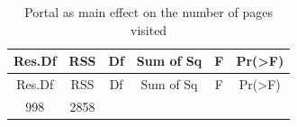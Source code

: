 \documentclass[]{article}
\begin{document}
\begin{longtable}[]{@{}cccccc@{}}
\caption{Portal as main effect on the number of pages
visited}\tabularnewline
\toprule
\begin{minipage}[b]{0.10\columnwidth}\centering\strut
Res.Df\strut
\end{minipage} & \begin{minipage}[b]{0.08\columnwidth}\centering\strut
RSS\strut
\end{minipage} & \begin{minipage}[b]{0.06\columnwidth}\centering\strut
Df\strut
\end{minipage} & \begin{minipage}[b]{0.14\columnwidth}\centering\strut
Sum of Sq\strut
\end{minipage} & \begin{minipage}[b]{0.09\columnwidth}\centering\strut
F\strut
\end{minipage} & \begin{minipage}[b]{0.13\columnwidth}\centering\strut
Pr(\textgreater{}F)\strut
\end{minipage}\tabularnewline
\midrule
\endfirsthead
\toprule
\begin{minipage}[b]{0.10\columnwidth}\centering\strut
Res.Df\strut
\end{minipage} & \begin{minipage}[b]{0.08\columnwidth}\centering\strut
RSS\strut
\end{minipage} & \begin{minipage}[b]{0.06\columnwidth}\centering\strut
Df\strut
\end{minipage} & \begin{minipage}[b]{0.14\columnwidth}\centering\strut
Sum of Sq\strut
\end{minipage} & \begin{minipage}[b]{0.09\columnwidth}\centering\strut
F\strut
\end{minipage} & \begin{minipage}[b]{0.13\columnwidth}\centering\strut
Pr(\textgreater{}F)\strut
\end{minipage}\tabularnewline
\midrule
\endhead
\begin{minipage}[t]{0.10\columnwidth}\centering\strut
998\strut
\end{minipage} & \begin{minipage}[t]{0.08\columnwidth}\centering\strut
2858\strut
\end{minipage} & \begin{minipage}[t]{0.06\columnwidth}\centering\strut

\end{minipage}
\end{longtable}
\end{document}
